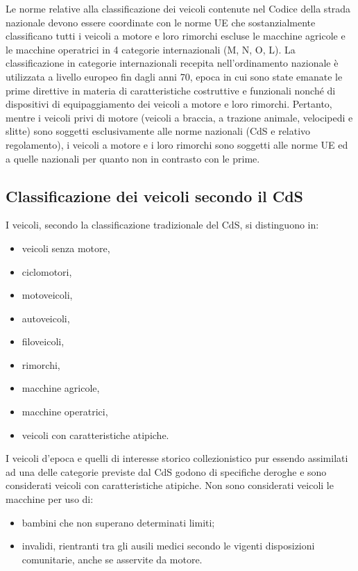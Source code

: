 	      Le norme relative alla classificazione dei veicoli contenute nel Codice della strada nazionale devono essere coordinate con le norme UE che sostanzialmente classificano tutti i veicoli a motore e loro rimorchi escluse le macchine agricole e le macchine operatrici in 4 categorie internazionali (M, N, O, L).
	      La classificazione in categorie internazionali recepita nell'ordinamento nazionale è utilizzata a livello europeo fin dagli anni 70, epoca in cui sono state emanate le prime direttive in materia di caratteristiche costruttive e funzionali nonché di dispositivi di equipaggiamento dei veicoli a motore e loro rimorchi.
	      Pertanto, mentre i veicoli privi di motore (veicoli a braccia, a trazione animale, velocipedi e slitte) sono soggetti esclusivamente alle norme nazionali (CdS e relativo regolamento), i veicoli a motore e i loro rimorchi sono soggetti alle norme UE ed a quelle nazionali per quanto non in contrasto con le prime.
	      
	      \subsection{Classificazione dei veicoli secondo il CdS}
	      
	      I veicoli, secondo la classificazione tradizionale del CdS, si distinguono in:
	      \begin{itemize}
	      	\item veicoli senza motore,
	      	\item ciclomotori,
	      	\item motoveicoli,
	      	\item autoveicoli,
	      	\item filoveicoli,
	      	\item rimorchi,
	      	\item macchine agricole,
	      	\item macchine operatrici,
	      	\item veicoli con caratteristiche atipiche.
	      \end{itemize}
	      
	      I veicoli d'epoca e quelli di interesse storico collezionistico pur essendo assimilati ad una delle categorie previste dal CdS godono di specifiche deroghe e sono considerati veicoli con caratteristiche atipiche.
	      Non sono considerati veicoli le macchine per uso di:
	      \begin{itemize}
	      	\item bambini che non superano determinati limiti;
	      	\item invalidi, rientranti tra gli ausili medici secondo le vigenti disposizioni comunitarie, anche se asservite da motore.
	      	      
	      \end{itemize}
